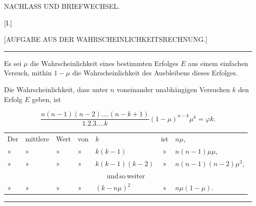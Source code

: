 \begin{center}
NACHLASS UND BRIEFWECHSEL.
\end{center}

\begin{center}
[I.]
\end{center}

\begin{center}
[AUFGABE AUS DER WAHRSCHEINLICHKEITSRECHNUNG.]
\end{center}

\bigskip
\hrule
\bigskip

Es sei $\mu$ die Wahrscheinlichkeit eines bestimmten Erfolges $E$ aus einem
einfachen Versuch, mithin $1-\mu$ die Wahrscheinlichkeit des Ausbleibens dieses
Erfolges.

Die Wahrscheinlichkeit, dass unter $n$ voneinander unabhängigen Versuchen $k$
den Erfolg $E$ geben, ist

\[
\frac{n(n-1)(n-2)....(n-k+1)}{1.2.3....k}(1-\mu)^{n-k}\mu^k = \varphi k.
\]

\begin{center}
\small\setlength{\tabcolsep}{3pt}
\begin{tabular}{lllllcl}
Der & mittlere & Wert & von & $k$ & ist & $n\mu$, \\
» & » & » & » & $k(k-1)$ & » & $n(n-1)\mu\mu$, \\
» & » & » & » & $k(k-1)(k-2)$ & » & $n(n-1)(n-2)\mu^3$, \\
\multicolumn{7}{c}{und\,so\,weiter}\\
» & » & » & » & $(k-n\mu)^2$ & » & $n\mu(1-\mu)$. \\
\end{tabular}
\end{center}

\bigskip
\hrule
